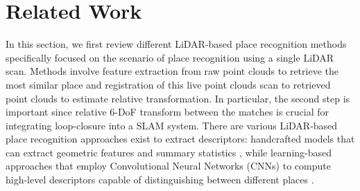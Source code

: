 \chapter{Related Work}
\label{sec:related}



In this section, we first review different LiDAR-based place recognition methods specifically focused on the scenario of place recognition using a single LiDAR scan. Methods involve feature extraction from raw point clouds to retrieve the most similar place and registration of this live point clouds scan to retrieved point clouds to estimate relative transformation. In particular, the second step is important since relative 6-DoF transform between the matches is crucial for integrating loop-closure into a SLAM system. There are various LiDAR-based place recognition approaches exist to extract descriptors: handcrafted models that can extract geometric features and summary statistics \cite{kim2018iros, yuan2023icra}, while learning-based approaches that employ Convolutional Neural Networks (CNNs) to compute high-level descriptors capable of distinguishing between different places \cite{vidanapathirana2022icra, komorowski2022ral}.\vspace{8pt}
 

